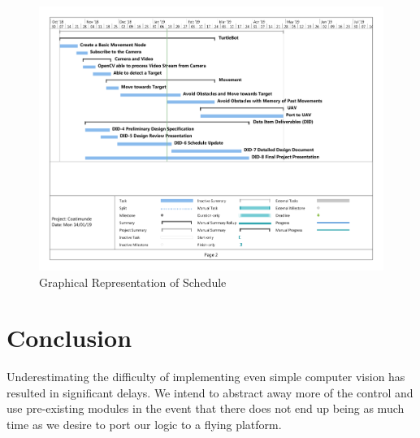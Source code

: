 \documentclass{article}
\begin{document}
	\begin{figure}[H]
		\centering
		\includegraphics[width=\linewidth]{SUp02}
		\caption{Graphical Representation of Schedule}
		\label{fig:SUp02}
	\end{figure}


\section{Conclusion}

	Underestimating the difficulty of implementing even simple computer vision has resulted in significant delays. We intend to abstract away more of the control and use pre-existing modules in the event that there does not end up being as much time as we desire to port our logic to a flying platform.


\end{document}

